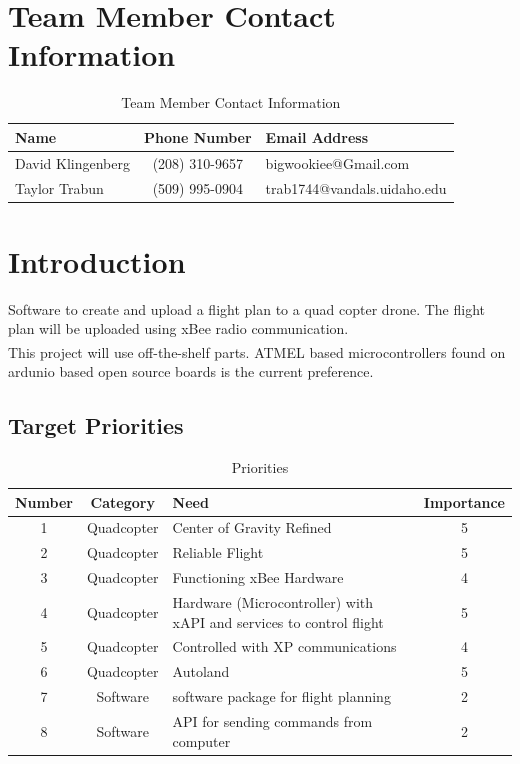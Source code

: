 \documentclass[pdftex,11pt]{article}
\begin{document}
\begin{titlepage}

\end{titlepage}

\tableofcontents
\listoffigures
\listoftables

\clearpage
{}
\setcounter{page}{1}
\section{Team Member Contact Information}
  \begin{table}[h]
		\begin{tabular}{| l | c | p{5cm} |}
		\hline
		Name & Phone Number & Email Address\\\hline
		David Klingenberg  &  (208) 310-9657 &  bigwookiee@Gmail.com\\
		Taylor Trabun & (509) 995-0904 & trab1744@vandals.uidaho.edu\\
		\hline
	\end{tabular}
\caption{Team Member Contact Information}
\label{table:1}
\end{table}


\section{Introduction}


Software to create and upload a flight plan to a quad copter drone. The flight plan will be uploaded using xBee radio communication.\\

This project will use off-the-shelf parts.  ATMEL\textsuperscript{\textcopyright} based microcontrollers found on ardunio based open source boards is the current preference.

\subsection{Target Priorities}

\begin{table}[h]
	\begin{tabular}{c | c | p{8cm} | c}
	\hline
		 Number & Category & Need & Importance \\ \hline
		 1 & Quadcopter & Center of Gravity Refined & 5 \\
		 2 & Quadcopter & Reliable Flight & 5 \\
		 3 & Quadcopter & Functioning xBee Hardware &  4 \\
		 4 & Quadcopter & Hardware (Microcontroller) with xAPI and services to control flight & 5 \\
		 5 & Quadcopter & Controlled with XP communications &  4 \\
	   6 & Quadcopter & Autoland & 5 \\
	   7 & Software & software package for flight planning & 2\\
	   8 & Software & API for sending commands from computer & 2\\
	\end{tabular}
	\caption{Priorities}
	\label{table:2}
\end{table}
\end{document}
